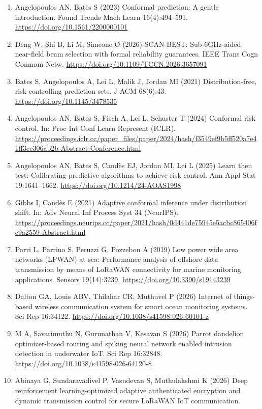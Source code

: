 \documentclass[
  11pt,
]{article}
\begin{document}
\begin{enumerate}
\item
  Angelopoulos AN, Bates S (2023) Conformal prediction: A gentle
  introduction. Found Trends Mach Learn 16(4):494--591.
  \url{https://doi.org/10.1561/2200000101}
\item
  Deng W, Shi B, Li M, Simeone O (2026) SCAN-BEST: Sub-6GHz-aided
  near-field beam selection with formal reliability guarantees. IEEE
  Trans Cogn Commun Netw.
  \url{https://doi.org/10.1109/TCCN.2026.3657091}
\item
  Bates S, Angelopoulos A, Lei L, Malik J, Jordan MI (2021)
  Distribution-free, risk-controlling prediction sets. J ACM 68(6):43.
  \url{https://doi.org/10.1145/3478535}
\item
  Angelopoulos AN, Bates S, Fisch A, Lei L, Schuster T (2024) Conformal
  risk control. In: Proc Int Conf Learn Represent (ICLR).
  \url{https://proceedings.iclr.cc/paper_files/paper/2024/hash/f3549ef9b5ff520a7e41ff3cc306ab2b-Abstract-Conference.html}
\item
  Angelopoulos AN, Bates S, Candès EJ, Jordan MI, Lei L (2025) Learn
  then test: Calibrating predictive algorithms to achieve risk control.
  Ann Appl Stat 19:1641--1662. \url{https://doi.org/10.1214/24-AOAS1998}
\item
  Gibbs I, Candès E (2021) Adaptive conformal inference under
  distribution shift. In: Adv Neural Inf Process Syst 34 (NeurIPS).
  \url{https://proceedings.neurips.cc/paper/2021/hash/0d441de75945e5acbc865406fc9a2559-Abstract.html}
\item
  Parri L, Parrino S, Peruzzi G, Pozzebon A (2019) Low power wide area
  networks (LPWAN) at sea: Performance analysis of offshore data
  transmission by means of LoRaWAN connectivity for marine monitoring
  applications. Sensors 19(14):3239.
  \url{https://doi.org/10.3390/s19143239}
\item
  Dalton GA, Louis ABV, Thilahar CR, Muthuvel P (2026) Internet of
  things-based wireless communication system for smart ocean monitoring
  systems. Sci Rep 16:34122.
  \url{https://doi.org/10.1038/s41598-026-60101-z}
\item
  M A, Savarimuthu N, Gurunathan V, Kesavan S (2026) Parrot dandelion
  optimizer-based routing and spiking neural network enabled intrusion
  detection in underwater IoT. Sci Rep 16:32848.
  \url{https://doi.org/10.1038/s41598-026-64120-8}
\item
  Abinaya G, Sundaravadivel P, Vasudevan S, Muthulakshmi K (2026) Deep
  reinforcement learning-optimized adaptive authenticated encryption and
  dynamic transmission control for secure LoRaWAN IoT communication.

\end{enumerate}
\end{document}
